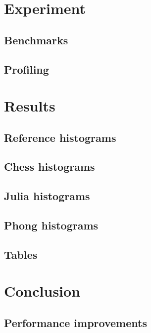 \documentclass{beamer}
\begin{document}
	\section{Experiment}
	\subsection{Benchmarks}
	
	\subsection{Profiling}
	

	\section{Results}
	\subsection{Reference histograms}
	
	\subsection{Chess histograms}
	
	\subsection{Julia histograms}
	
	\subsection{Phong histograms}
	

	\subsection{Tables}
	

	\section{Conclusion}
	\subsection{Performance improvements}
	
\end{document}
